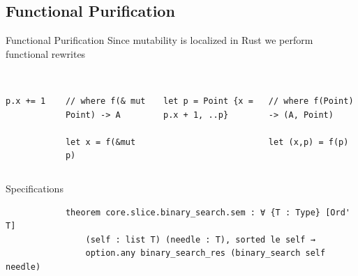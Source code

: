 \documentclass[usenames,dvipsnames,aspectratio=169]{beamer}
\begin{document}
\subsection{Functional Purification}
\begin{frame}[fragile]{Functional Purification}
    Since mutability is localized in Rust we perform functional rewrites
    \begin{columns}
        \begin{block}{}
            \begin{verbatim}
                p.x += 1
            \end{verbatim}
        \end{block}

        \begin{block}{}
            \begin{verbatim}
                // where f(& mut Point) -> A
                let x = f(&mut p) 
            \end{verbatim}
        \end{block}
        
        \begin{block}{}
            \begin{verbatim}
                let p = Point {x = p.x + 1, ..p}
            \end{verbatim}
        \end{block}

        \begin{block}{}
            \begin{verbatim}
                // where f(Point) -> (A, Point)
                let (x,p) = f(p) 
            \end{verbatim}
        \end{block}
    \end{columns}
\end{frame}

\begin{frame}[fragile]{Specifications}
    \begin{block}{}
        \begin{verbatim}
            theorem core.slice.binary_search.sem : ∀ {T : Type} [Ord' T]
                (self : list T) (needle : T), sorted le self →
                option.any binary_search_res (binary_search self needle)
        \end{verbatim}
    \end{block}
\end{frame}
\end{document}
